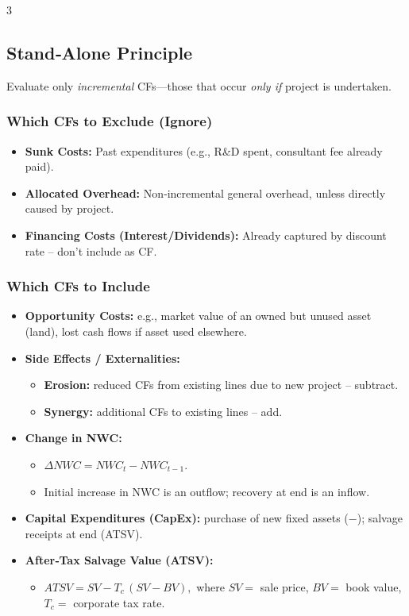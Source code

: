 \documentclass[10pt,landscape,fleqn]{article}
\begin{document}
\begin{multicols}{3}
\subsection*{Stand‐Alone Principle}
Evaluate only \emph{incremental} CFs—those that occur \emph{only if} project is undertaken.

\subsubsection*{Which CFs to Exclude (Ignore)}
\begin{itemize}
  \item \textbf{Sunk Costs:} Past expenditures (e.g., R\&D spent, consultant fee already paid). 
  \item \textbf{Allocated Overhead:} Non‐incremental general overhead, unless directly caused by project.
  \item \textbf{Financing Costs (Interest/Dividends):} Already captured by discount rate – don’t include as CF.
\end{itemize}

\subsubsection*{Which CFs to Include}
\begin{itemize}
  \item \textbf{Opportunity Costs:} e.g., market value of an owned but unused asset (land), lost cash flows if asset used elsewhere.
  \item \textbf{Side Effects / Externalities:} 
    \begin{itemize}
      \item \textbf{Erosion:} reduced CFs from existing lines due to new project – subtract.
      \item \textbf{Synergy:} additional CFs to existing lines – add.
    \end{itemize}
  \item \textbf{Change in NWC:} 
    \begin{itemize}
      \item $\Delta NWC = NWC_t - NWC_{t-1}.$
      \item Initial increase in NWC is an outflow; recovery at end is an inflow.
    \end{itemize}
  \item \textbf{Capital Expenditures (CapEx):} purchase of new fixed assets ($-$); salvage receipts at end (ATSV).
  \item \textbf{After‐Tax Salvage Value (ATSV):}
    \begin{itemize}
      \item $ATSV = SV - T_c\,(SV - BV),$ where $SV =$ sale price, $BV =$ book value, $T_c =$ corporate tax rate.
    \end{itemize}
\end{itemize}

\end{multicols}
\end{document}

